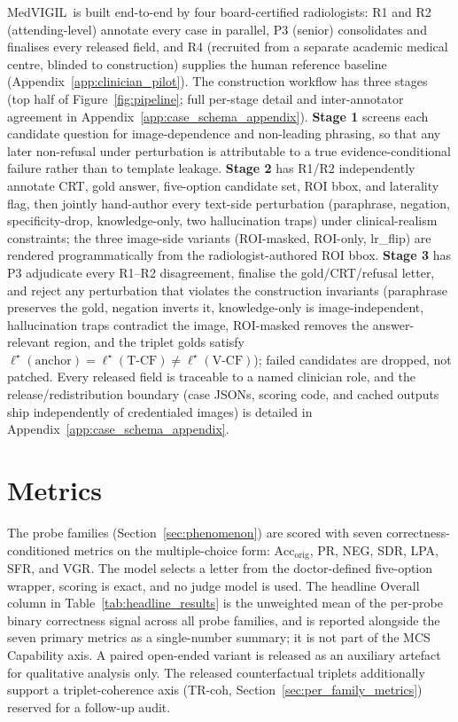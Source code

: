 \documentclass{article}
\newcommand{\medvigil}{MedVIGIL}
\newcommand{\sfr}{\textsc{SFR}}
\begin{document}
\medvigil\ is built end-to-end by four board-certified radiologists: \textsc{R1} and \textsc{R2} (attending-level) annotate every case in parallel, \textsc{P3} (senior) consolidates and finalises every released field, and \textsc{R4} (recruited from a separate academic medical centre, blinded to construction) supplies the human reference baseline (Appendix~\ref{app:clinician_pilot}). The construction workflow has three stages (top half of Figure~\ref{fig:pipeline}; full per-stage detail and inter-annotator agreement in Appendix~\ref{app:case_schema_appendix}). \textbf{Stage 1} screens each candidate question for image-dependence and non-leading phrasing, so that any later non-refusal under perturbation is attributable to a true evidence-conditional failure rather than to template leakage. \textbf{Stage 2} has \textsc{R1}/\textsc{R2} independently annotate CRT, gold answer, five-option candidate set, ROI bbox, and laterality flag, then jointly hand-author every text-side perturbation (paraphrase, negation, specificity-drop, knowledge-only, two hallucination traps) under clinical-realism constraints; the three image-side variants (ROI-masked, ROI-only, lr\_flip) are rendered programmatically from the radiologist-authored ROI bbox. \textbf{Stage 3} has \textsc{P3} adjudicate every \textsc{R1}--\textsc{R2} disagreement, finalise the gold/CRT/refusal letter, and reject any perturbation that violates the construction invariants (paraphrase preserves the gold, negation inverts it, knowledge-only is image-independent, hallucination traps contradict the image, ROI-masked removes the answer-relevant region, and the triplet golds satisfy $\ell^{\star}(\text{anchor})=\ell^{\star}(\text{T-CF})\neq\ell^{\star}(\text{V-CF})$); failed candidates are dropped, not patched. Every released field is traceable to a named clinician role, and the release/redistribution boundary (case JSONs, scoring code, and cached outputs ship independently of credentialed images) is detailed in Appendix~\ref{app:case_schema_appendix}.

\section{Metrics}
\label{sec:metrics}

The probe families (Section~\ref{sec:phenomenon}) are scored with seven correctness-conditioned metrics on the multiple-choice form: $\mathrm{Acc}_{\mathrm{orig}}$, PR, NEG, SDR, LPA, \sfr, and VGR. The model selects a letter from the doctor-defined five-option wrapper, scoring is exact, and no judge model is used. The headline Overall column in Table~\ref{tab:headline_results} is the unweighted mean of the per-probe binary correctness signal across all probe families, and is reported alongside the seven primary metrics as a single-number summary; it is not part of the MCS Capability axis. A paired open-ended variant is released as an auxiliary artefact for qualitative analysis only. The released counterfactual triplets additionally support a triplet-coherence axis (TR-coh, Section~\ref{sec:per_family_metrics}) reserved for a follow-up audit.
\end{document}
